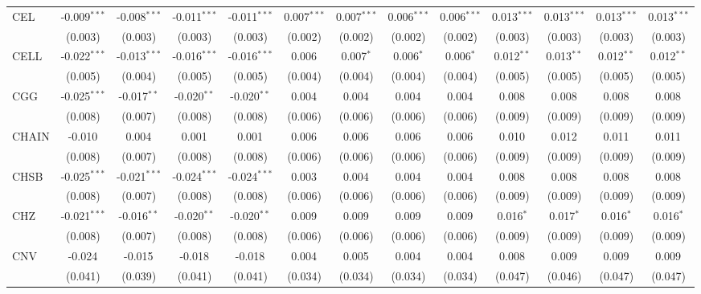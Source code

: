 \begin{table}[!htbp]
\begin{tabular}{@{\extracolsep{5pt}}lcccccccccccc}
 CEL & -0.009$^{***}$ & -0.008$^{***}$ & -0.011$^{***}$ & -0.011$^{***}$ & 0.007$^{***}$ & 0.007$^{***}$ & 0.006$^{***}$ & 0.006$^{***}$ & 0.013$^{***}$ & 0.013$^{***}$ & 0.013$^{***}$ & 0.013$^{***}$ \\
  & (0.003) & (0.003) & (0.003) & (0.003) & (0.002) & (0.002) & (0.002) & (0.002) & (0.003) & (0.003) & (0.003) & (0.003) \\
 CELL & -0.022$^{***}$ & -0.013$^{***}$ & -0.016$^{***}$ & -0.016$^{***}$ & 0.006$^{}$ & 0.007$^{*}$ & 0.006$^{*}$ & 0.006$^{*}$ & 0.012$^{**}$ & 0.013$^{**}$ & 0.012$^{**}$ & 0.012$^{**}$ \\
  & (0.005) & (0.004) & (0.005) & (0.005) & (0.004) & (0.004) & (0.004) & (0.004) & (0.005) & (0.005) & (0.005) & (0.005) \\
 CGG & -0.025$^{***}$ & -0.017$^{**}$ & -0.020$^{**}$ & -0.020$^{**}$ & 0.004$^{}$ & 0.004$^{}$ & 0.004$^{}$ & 0.004$^{}$ & 0.008$^{}$ & 0.008$^{}$ & 0.008$^{}$ & 0.008$^{}$ \\
  & (0.008) & (0.007) & (0.008) & (0.008) & (0.006) & (0.006) & (0.006) & (0.006) & (0.009) & (0.009) & (0.009) & (0.009) \\
 CHAIN & -0.010$^{}$ & 0.004$^{}$ & 0.001$^{}$ & 0.001$^{}$ & 0.006$^{}$ & 0.006$^{}$ & 0.006$^{}$ & 0.006$^{}$ & 0.010$^{}$ & 0.012$^{}$ & 0.011$^{}$ & 0.011$^{}$ \\
  & (0.008) & (0.007) & (0.008) & (0.008) & (0.006) & (0.006) & (0.006) & (0.006) & (0.009) & (0.009) & (0.009) & (0.009) \\
 CHSB & -0.025$^{***}$ & -0.021$^{***}$ & -0.024$^{***}$ & -0.024$^{***}$ & 0.003$^{}$ & 0.004$^{}$ & 0.004$^{}$ & 0.004$^{}$ & 0.008$^{}$ & 0.008$^{}$ & 0.008$^{}$ & 0.008$^{}$ \\
  & (0.008) & (0.007) & (0.008) & (0.008) & (0.006) & (0.006) & (0.006) & (0.006) & (0.009) & (0.009) & (0.009) & (0.009) \\
 CHZ & -0.021$^{***}$ & -0.016$^{**}$ & -0.020$^{**}$ & -0.020$^{**}$ & 0.009$^{}$ & 0.009$^{}$ & 0.009$^{}$ & 0.009$^{}$ & 0.016$^{*}$ & 0.017$^{*}$ & 0.016$^{*}$ & 0.016$^{*}$ \\
  & (0.008) & (0.007) & (0.008) & (0.008) & (0.006) & (0.006) & (0.006) & (0.006) & (0.009) & (0.009) & (0.009) & (0.009) \\
 CNV & -0.024$^{}$ & -0.015$^{}$ & -0.018$^{}$ & -0.018$^{}$ & 0.004$^{}$ & 0.005$^{}$ & 0.004$^{}$ & 0.004$^{}$ & 0.008$^{}$ & 0.009$^{}$ & 0.009$^{}$ & 0.009$^{}$ \\
  & (0.041) & (0.039) & (0.041) & (0.041) & (0.034) & (0.034) & (0.034) & (0.034) & (0.047) & (0.046) & (0.047) & (0.047) \\

\end{tabular}
\end{table}
